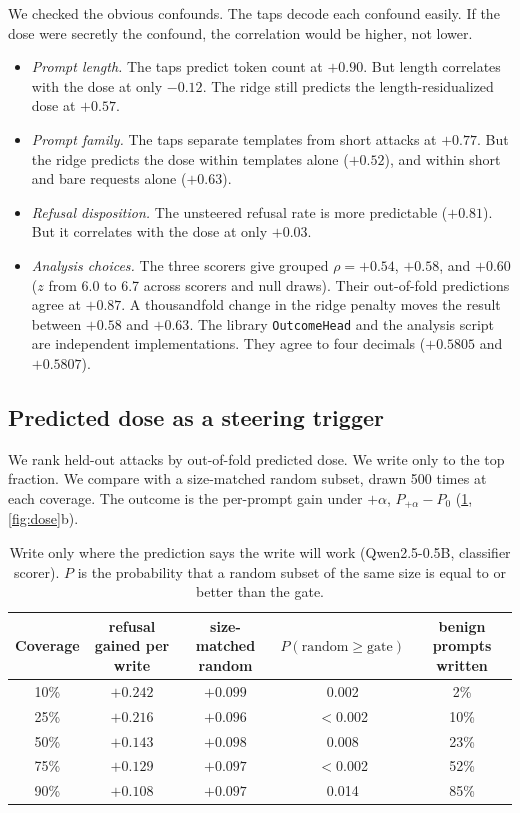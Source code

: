 \documentclass[11pt]{article}
\begin{document}
We checked the obvious confounds. The taps decode each confound easily. If the dose were secretly the confound, the correlation would be higher, not lower.
\begin{itemize}[leftmargin=*]
  \item \emph{Prompt length.} The taps predict token count at $+0.90$. But length correlates with the dose
    at only $-0.12$. The ridge still predicts the length-residualized dose at $+0.57$.
  \item \emph{Prompt family.} The taps separate templates from short attacks at $+0.77$. But the ridge
    predicts the dose within templates alone ($+0.52$), and within short and bare requests alone ($+0.63$).
  \item \emph{Refusal disposition.} The unsteered refusal rate is more predictable ($+0.81$). But it
    correlates with the dose at only $+0.03$.
  \item \emph{Analysis choices.} The three scorers give grouped $\rho=+0.54$, $+0.58$, and $+0.60$ ($z$ from
    6.0 to 6.7 across scorers and null draws). Their out-of-fold predictions agree at $+0.87$. A thousandfold
    change in the ridge penalty moves the result between $+0.58$ and $+0.63$. The library
    \texttt{OutcomeHead} and the analysis script are independent implementations. They agree to four
    decimals ($+0.5805$ and $+0.5807$).
\end{itemize}

\subsection{Predicted dose as a steering trigger}
\label{sec:outcomegate}
We rank held-out attacks by out-of-fold predicted dose. We write only to the top fraction. We compare with a
size-matched random subset, drawn 500 times at each coverage. The outcome is the per-prompt gain under
$+\alpha$, $P_{+\alpha}-P_{0}$ (\cref{tab:coverage}, \cref{fig:dose}b).

\begin{table}[t]
\centering
\footnotesize\setlength{\tabcolsep}{4pt}
\caption{Write only where the prediction says the write will work (Qwen2.5-0.5B, classifier scorer).
$P$ is the probability that a random subset of the same size is equal to or better than the gate.}
\label{tab:coverage}
\begin{tabular}{ccccc}
\toprule
Coverage & refusal gained per write & size-matched random & $P(\text{random}\geq\text{gate})$ & benign prompts written \\
\midrule
10\% & $+0.242$ & $+0.099$ & 0.002 & 2\% \\
25\% & $+0.216$ & $+0.096$ & $<$0.002 & 10\% \\
50\% & $+0.143$ & $+0.098$ & 0.008 & 23\% \\
75\% & $+0.129$ & $+0.097$ & $<$0.002 & 52\% \\
90\% & $+0.108$ & $+0.097$ & 0.014 & 85\% \\
\bottomrule
\end{tabular}
\end{table}
\end{document}

